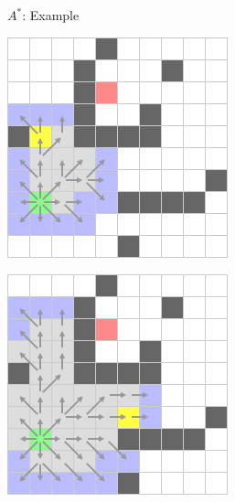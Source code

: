 \documentclass{presentation}
\begin{document}
\begin{frame}{$A^*$: Example}
\begin{minipage}{0.23\textwidth}
	\end{minipage}%
	\hfill%
	\begin{minipage}{0.23\textwidth}
		\includegraphics[width=\textwidth]{figures/A-Stern_geschnitten(241x241)/7.png}
	\end{minipage}%
	\hfill%
	\begin{minipage}{0.23\textwidth}
		\includegraphics[width=\textwidth]{figures/A-Stern_geschnitten(241x241)/8.png}

\end{minipage}
\end{frame}
\end{document}

